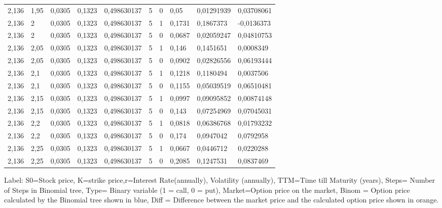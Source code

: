 \documentclass[11pt, titlepage]{article}
\begin{document}
{{\begin{table}[ht]
\begin{tabular}{@{}llllllllll@{}}
2,136 & 1,95 & 0,0305 & 0,1323 & 0,498630137 & 5 & 0 & 0,05 & {\color[HTML]{3531FF} 0,01291939} & {\color[HTML]{F8A102} 0,03708061} \\
2,136 & 2 & 0,0305 & 0,1323 & 0,498630137 & 5 & 1 & 0,1731 & {\color[HTML]{3531FF} 0,1867373} & {\color[HTML]{F8A102} -0,0136373} \\
2,136 & 2 & 0,0305 & 0,1323 & 0,498630137 & 5 & 0 & 0,0687 & {\color[HTML]{3531FF} 0,02059247} & {\color[HTML]{F8A102} 0,04810753} \\
2,136 & 2,05 & 0,0305 & 0,1323 & 0,498630137 & 5 & 1 & 0,146 & {\color[HTML]{3531FF} 0,1451651} & {\color[HTML]{F8A102} 0,0008349} \\
2,136 & 2,05 & 0,0305 & 0,1323 & 0,498630137 & 5 & 0 & 0,0902 & {\color[HTML]{3531FF} 0,02826556} & {\color[HTML]{F8A102} 0,06193444} \\
2,136 & 2,1 & 0,0305 & 0,1323 & 0,498630137 & 5 & 1 & 0,1218 & {\color[HTML]{3531FF} 0,1180494} & {\color[HTML]{F8A102} 0,0037506} \\
2,136 & 2,1 & 0,0305 & 0,1323 & 0,498630137 & 5 & 0 & 0,1155 & {\color[HTML]{3531FF} 0,05039519} & {\color[HTML]{F8A102} 0,06510481} \\
2,136 & 2,15 & 0,0305 & 0,1323 & 0,498630137 & 5 & 1 & 0,0997 & {\color[HTML]{3531FF} 0,09095852} & {\color[HTML]{F8A102} 0,00874148} \\
2,136 & 2,15 & 0,0305 & 0,1323 & 0,498630137 & 5 & 0 & 0,143 & {\color[HTML]{3531FF} 0,07254969} & {\color[HTML]{F8A102} 0,07045031} \\
2,136 & 2,2 & 0,0305 & 0,1323 & 0,498630137 & 5 & 1 & 0,0818 & {\color[HTML]{3531FF} 0,06386768} & {\color[HTML]{F8A102} 0,01793232} \\
2,136 & 2,2 & 0,0305 & 0,1323 & 0,498630137 & 5 & 0 & 0,174 & {\color[HTML]{3531FF} 0,0947042} & {\color[HTML]{F8A102} 0,0792958} \\
2,136 & 2,25 & 0,0305 & 0,1323 & 0,498630137 & 5 & 1 & 0,0667 & {\color[HTML]{3531FF} 0,0446712} & {\color[HTML]{F8A102} 0,0220288} \\
2,136 & 2,25 & 0,0305 & 0,1323 & 0,498630137 & 5 & 0 & 0,2085 & {\color[HTML]{3531FF} 0,1247531} & {\color[HTML]{F8A102} 0,0837469} \\ \bottomrule
\end{tabular}
\end{table}
Label: S0=Stock price, K=strike price,r=Interest Rate(annually), Volatility (annually), TTM=Time till Maturity (years), Steps= Number of Steps in Binomial tree, Type= Binary variable (1 = call, 0 = put), Market=Option price on the market, Binom = Option price calculated by the Binomial tree shown in blue, Diff = Difference between the market price and the calculated option price shown in orange.
}
}
\end{document}
